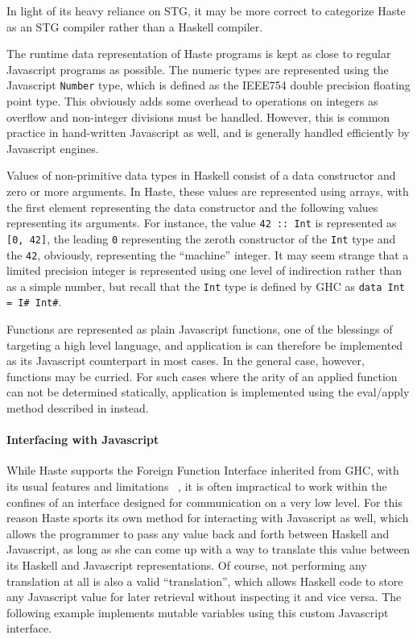 \documentclass[preprint]{sigplanconf}
\begin{document}
In light of its heavy reliance on STG, it may be more correct to categorize
Haste as an STG compiler rather than a Haskell compiler.

The runtime data representation of Haste programs is kept as close to regular
Javascript programs as possible. The numeric types are represented using the
Javascript \lstinline!Number! type, which is defined as the IEEE754 double
precision floating point type. This obviously adds some overhead to operations
on integers as overflow and non-integer divisions must be handled. However, this
is common practice in hand-written Javascript as well, and is generally handled
efficiently by Javascript engines.

Values of non-primitive data types in Haskell consist of a data constructor and
zero or more arguments. In Haste, these values are represented using arrays,
with the first element representing the data constructor and the following
values representing its arguments. For instance, the value \lstinline!42 :: Int!
is represented as \lstinline![0, 42]!, the leading \lstinline!0! representing
the zeroth constructor of the \lstinline!Int! type and the \lstinline!42!,
obviously, representing the ``machine'' integer. It may seem strange that a
limited precision integer is represented using one level of indirection rather
than as a simple number, but recall that the \lstinline!Int! type is defined by
GHC as \lstinline!data Int = I# Int#!.

Functions are represented as plain Javascript functions, one of the blessings
of targeting a high level language, and application is can therefore be
implemented as its Javascript counterpart in most cases. In the general case,
however, functions may be curried. For such cases where the arity of an applied
function can not be determined statically, application is implemented using the
eval/apply method described in \cite{fastcurry} instead.

\paragraph{Interfacing with Javascript} While Haste supports the Foreign
Function Interface inherited from GHC, with its usual features and limitations
\ \cite{ffi}, it is often impractical to work within the confines of an
interface designed for communication on a very low level. For this reason
Haste sports its own method for interacting with Javascript as well, which
allows the programmer to pass any value back and forth between Haskell and
Javascript, as long as she can come up with a way to translate this value
between its Haskell and Javascript representations. Of course, not performing
any translation at all is also a valid ``translation'', which allows Haskell
code to store any Javascript value for later retrieval without inspecting it
and vice versa. The following example implements mutable variables using this
custom Javascript interface.
\end{document}
